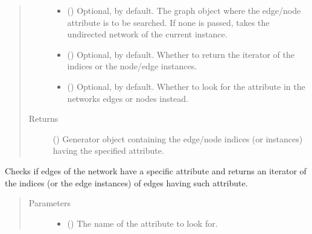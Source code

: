 \documentclass[letterpaper,10pt,english]{sphinxmanual}
\begin{document}
\begin{fulllineitems}
\begin{fulllineitems}
\begin{quote}
\begin{description}
\begin{itemize}
\item {} 
 () \textendash{} Optional,  by default. The graph object where the
edge/node attribute is to be searched. If none is passed,
takes the undirected network of the current instance.

\item {} 
 () \textendash{} Optional,  by default. Whether to return the
iterator of the indices or the node/edge instances.

\item {} 
 () \textendash{} Optional,  by default. Whether to look for the
attribute in the networks edges or nodes instead.

\end{itemize}

\item[{Returns}] \leavevmode
() \textendash{} Generator object containing the edge/node
indices (or instances) having the specified attribute.

\end{description}\end{quote}

\end{fulllineitems}


\begin{fulllineitems}
\label{\detokenize{main:pypath.main.PyPath.having_eattr}}
Checks if edges of the network have a specific attribute and
returns an iterator of the indices (or the edge instances) of
edges having such attribute.
\begin{quote}\begin{description}
\item[{Parameters}] \leavevmode\begin{itemize}
\item {} 
 () \textendash{} The name of the attribute to look for.


\end{itemize}
\end{description}
\end{quote}
\end{fulllineitems}
\end{fulllineitems}
\end{document}
